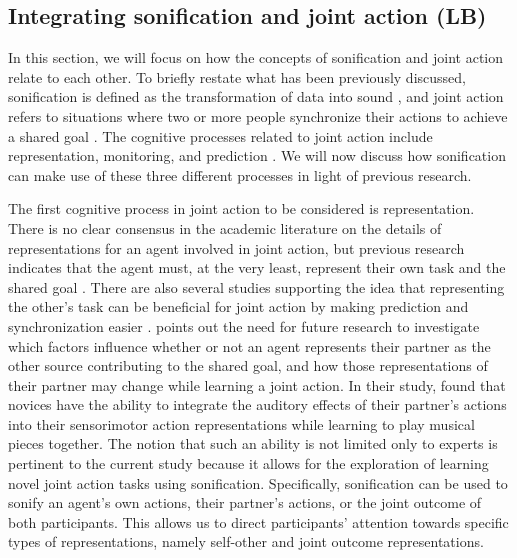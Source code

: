 \documentclass[10pt,a4paper,onecolumn]{article}
\begin{document}
\hypertarget{integrating-sonification-and-joint-action-lb}{%
\subsection{Integrating sonification and joint action (LB)}\label{integrating-sonification-and-joint-action-lb}}

In this section, we will focus on how the concepts of sonification and joint action relate to each other. To briefly restate what has been previously discussed, sonification is defined as the transformation of data into sound \autocite{kramerSonificationReportStatus1999}, and joint action refers to situations where two or more people synchronize their actions to achieve a shared goal \autocite{knoblichPsychologicalResearchJoint2011}. The cognitive processes related to joint action include representation, monitoring, and prediction \autocite{loehrMonitoringIndividualJoint2013,sebanzJointActionBodies2006,vesperMinimalArchitectureJoint2010}. We will now discuss how sonification can make use of these three different processes in light of previous research.

The first cognitive process in joint action to be considered is representation. There is no clear consensus in the academic literature on the details of representations for an agent involved in joint action, but previous research indicates that the agent must, at the very least, represent their own task and the shared goal \autocite{vesperMinimalArchitectureJoint2010}. There are also several studies supporting the idea that representing the other's task can be beneficial for joint action by making prediction and synchronization easier \autocite{boltSensoryAttenuationAuditory2021,kellerPianistsDuetBetter2007,kourtisPredictiveRepresentationOther2012,sebanzJointActionBodies2006,wenkeWhatSharedJoint2011}. \textcite{loehrSoundYouMe2016} points out the need for future research to investigate which factors influence whether or not an agent represents their partner as the other source contributing to the shared goal, and how those representations of their partner may change while learning a joint action. In their study, \textcite{loehrSoundYouMe2016} found that novices have the ability to integrate the auditory effects of their partner's actions into their sensorimotor action representations while learning to play musical pieces together. The notion that such an ability is not limited only to experts is pertinent to the current study because it allows for the exploration of learning novel joint action tasks using sonification. Specifically, sonification can be used to sonify an agent's own actions, their partner's actions, or the joint outcome of both participants. This allows us to direct participants' attention towards specific types of representations, namely self-other and joint outcome representations.
\end{document}
